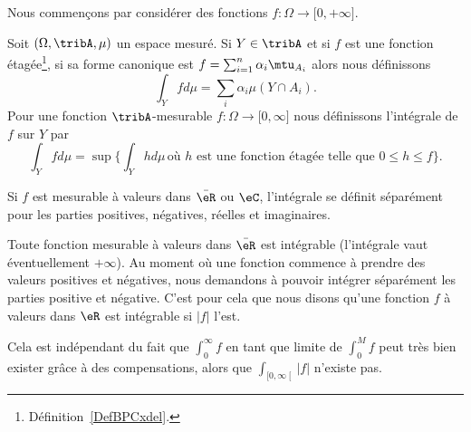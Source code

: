 Nous commençons par considérer des fonctions \( f\colon \Omega\to \mathopen[ 0 , +\infty \mathclose]\).

\begin{definition}  \label{DefTVOooleEst}
    Soit \( (\Omega,\tribA,\mu)\) un espace mesuré. Si \( Y\in \tribA\) et si \( f\) est une fonction étagée\footnote{Définition~\ref{DefBPCxdel}.}, si sa forme canonique est \( f=\sum_{i=1}^n\alpha_i\mtu_{A_i}\) alors nous définissons
    \begin{equation}        \label{EqooGAFMooZLzjPs}
        \int_Yfd\mu=\sum_i\alpha_i\mu(Y\cap A_i).
    \end{equation}
    Pour une fonction \( \tribA\)-mesurable \( f\colon \Omega\to \mathopen[ 0 , \infty \mathclose]\) nous définissons l'intégrale de \( f\) sur \( Y\) par
    \begin{equation}        \label{EqDefintYfdmu}
        \int_Yfd\mu=\sup\Big\{ \int_Yhd\mu\,\text{où } h\text{ est une fonction étagée telle que } 0\leq h\leq f \Big\}.
    \end{equation}

    Si $f$ est mesurable à valeurs dans \( \bar \eR\) ou \( \eC\), l'intégrale se définit séparément pour les parties positives, négatives, réelles et imaginaires.
\end{definition}

\begin{remark}
    Toute fonction mesurable à valeurs dans \( \bar \eR\) est intégrable (l'intégrale vaut éventuellement \( +\infty\)). Au moment où une fonction commence à prendre des valeurs positives et négatives, nous demandons à pouvoir intégrer séparément les parties positive et négative. C'est pour cela que nous disons qu'une fonction \( f\) à valeurs dans \( \eR\) est intégrable si \( | f |\) l'est.

    Cela est indépendant du fait que \( \int_0^{\infty}f\) en tant que limite de \( \int_0^{M}f\) peut très bien exister grâce à des compensations, alors que \( \int_{\mathopen[ 0 , \infty \mathclose[}| f |\) n'existe pas.
\end{remark}

